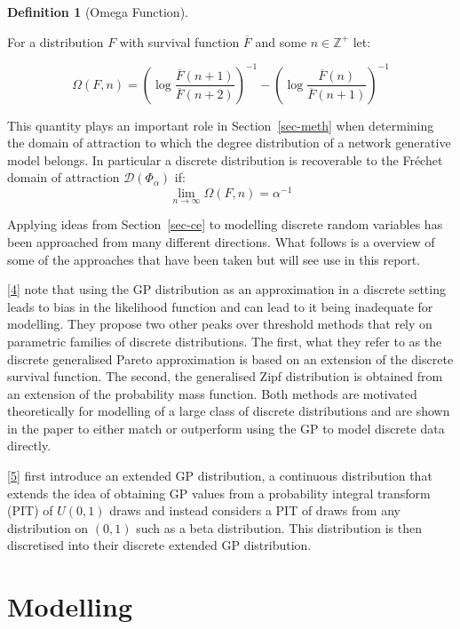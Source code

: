 \documentclass[
  10pt,
  a4paper,
]{scrreprt}
\theoremstyle{definition}
\newtheorem{definition}{Definition}[section]
\theoremstyle{plain}
\theoremstyle{plain}
\theoremstyle{plain}
\theoremstyle{remark}
\begin{document}
{\begin{definition}[Omega
Function]\protect\hypertarget{def-omega}{}\label{def-omega}

For a distribution \(F\) with survival function \(\overline F\) and some
\(n\in\mathbb Z^+\) let:

\[
\Omega(F,n) = \left(\log\displaystyle\frac{\overline F (n+1)}{\overline F (n+2)}\right)^{-1} - \left(\log\displaystyle\frac{\overline F (n)}{\overline F (n+1)}\right)^{-1}
\]

\end{definition}

This quantity plays an important role in Section~\ref{sec-meth} when
determining the domain of attraction to which the degree distribution of
a network generative model belongs. In particular a discrete
distribution is recoverable to the Fréchet domain of attraction
\(\mathcal D(\Phi_\alpha)\) if: \[
\lim_{n\rightarrow\infty}\Omega(F,n) = \alpha^{-1}
\]

Applying ideas from Section~\ref{sec-ce} to modelling discrete random
variables has been approached from many different directions. What
follows is a overview of some of the approaches that have been taken but
will see use in this report.

{[}\protect\hyperlink{ref-hds24}{4}{]} note that using the GP
distribution as an approximation in a discrete setting leads to bias in
the likelihood function and can lead to it being inadequate for
modelling. They propose two other peaks over threshold methods that rely
on parametric families of discrete distributions. The first, what they
refer to as the discrete generalised Pareto approximation is based on an
extension of the discrete survival function. The second, the generalised
Zipf distribution is obtained from an extension of the probability mass
function. Both methods are motivated theoretically for modelling of a
large class of discrete distributions and are shown in the paper to
either match or outperform using the GP to model discrete data directly.

{[}\protect\hyperlink{ref-agn22}{5}{]} first introduce an extended GP
distribution, a continuous distribution that extends the idea of
obtaining GP values from a probability integral transform (PIT) of
\(U(0,1)\) draws and instead considers a PIT of draws from any
distribution on \((0,1)\) such as a beta distribution. This distribution
is then discretised into their discrete extended GP distribution.

\hypertarget{sec-mod}{%
\section{Modelling}\label{sec-mod}}

}
\end{document}
